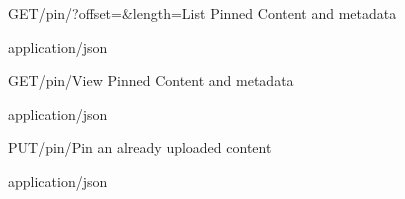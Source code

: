 
\begin{apiRoute}{GET}{/pin/?offset=\&length=}{List Pinned Content and metadata}
{
}
{ }

\begin{queryParameter} 
\end{queryParameter}
\begin{routeResponse}{application/json}
\end{routeResponse}
\end{apiRoute}


\begin{apiRoute}{GET}{/pin/}{View Pinned Content and metadata}
{
}
{ }

\begin{queryParameter} 
\end{queryParameter}
\begin{routeResponse}{application/json}
\end{routeResponse}
\end{apiRoute}




\begin{apiRoute}{PUT}{/pin/}{Pin an already uploaded content}
{
}
{ }

\begin{routeParameter} 
\end{routeParameter}
\begin{routeResponse}{application/json}
\end{routeResponse}
\end{apiRoute}





  
